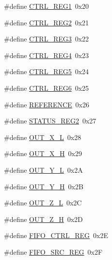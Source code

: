 \begin{DoxyCompactItemize}
\item 
\#define \hyperlink{group___definitions___a_d_s1299_gabd83ea49367ca7850ffc9091890aa46b}{C\+T\+R\+L\+\_\+\+R\+E\+G1}~0x20
\item 
\#define \hyperlink{group___definitions___a_d_s1299_gafd5ce55297b11bfc3c750a359b80de46}{C\+T\+R\+L\+\_\+\+R\+E\+G2}~0x21
\item 
\#define \hyperlink{group___definitions___a_d_s1299_gacdb673970b82f2380da68c9e8d1dc5c6}{C\+T\+R\+L\+\_\+\+R\+E\+G3}~0x22
\item 
\#define \hyperlink{group___definitions___a_d_s1299_ga36c532b0a660c101907dcad7ee399fbd}{C\+T\+R\+L\+\_\+\+R\+E\+G4}~0x23
\item 
\#define \hyperlink{group___definitions___a_d_s1299_ga97cbbf0a1e80e40544629e925e5a9026}{C\+T\+R\+L\+\_\+\+R\+E\+G5}~0x24
\item 
\#define \hyperlink{group___definitions___a_d_s1299_gaa23de000c06ad03c55eea4ef3062279d}{C\+T\+R\+L\+\_\+\+R\+E\+G6}~0x25
\item 
\#define \hyperlink{group___definitions___a_d_s1299_ga62a0f8a0b822f31ff84bc8252b33e7c8}{R\+E\+F\+E\+R\+E\+N\+C\+E}~0x26
\item 
\#define \hyperlink{group___definitions___a_d_s1299_gac5289782d4398220ff718751de7e8f15}{S\+T\+A\+T\+U\+S\+\_\+\+R\+E\+G2}~0x27
\item 
\#define \hyperlink{group___definitions___a_d_s1299_ga7a4d341c8dd90a78b5d073c450ad9fe6}{O\+U\+T\+\_\+\+X\+\_\+\+L}~0x28
\item 
\#define \hyperlink{group___definitions___a_d_s1299_gaf3419eb79d96b0179006217d77eb093c}{O\+U\+T\+\_\+\+X\+\_\+\+H}~0x29
\item 
\#define \hyperlink{group___definitions___a_d_s1299_gafb7888eaca1ba1dd4c7702a7da5b132e}{O\+U\+T\+\_\+\+Y\+\_\+\+L}~0x2\+A
\item 
\#define \hyperlink{group___definitions___a_d_s1299_gac1dcb47bc35099013ba90efe93d108fd}{O\+U\+T\+\_\+\+Y\+\_\+\+H}~0x2\+B
\item 
\#define \hyperlink{group___definitions___a_d_s1299_ga1c28426236e35c599d9804b7b26d35c9}{O\+U\+T\+\_\+\+Z\+\_\+\+L}~0x2\+C
\item 
\#define \hyperlink{group___definitions___a_d_s1299_ga98fe007407ff9fbb53d7d70dbd44cf03}{O\+U\+T\+\_\+\+Z\+\_\+\+H}~0x2\+D
\item 
\#define \hyperlink{group___definitions___a_d_s1299_ga29432833b09d7fb87e2045094eb22a2b}{F\+I\+F\+O\+\_\+\+C\+T\+R\+L\+\_\+\+R\+E\+G}~0x2\+E
\item 
\#define \hyperlink{group___definitions___a_d_s1299_ga2a04de09a100f00b546d9539fd117cee}{F\+I\+F\+O\+\_\+\+S\+R\+C\+\_\+\+R\+E\+G}~0x2\+F

\end{DoxyCompactItemize}

